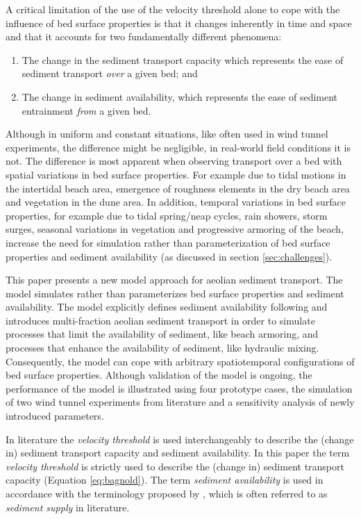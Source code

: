 A critical limitation of the use of the velocity threshold alone to
cope with the influence of bed surface properties is that it changes
inherently in time and space \citep{Stout2004} and that it accounts
for two fundamentally different phenomena:
\begin{enumerate}
\item The change in the sediment transport capacity which represents
  the ease of sediment transport \emph{over} a given bed; and
\item The change in sediment availability, which represents the ease
  of sediment entrainment \emph{from} a given bed.
\end{enumerate}
\noindent Although in uniform and constant situations, like often used
in wind tunnel experiments, the difference might be negligible, in
real-world field conditions it is not. The difference is most apparent
when observing transport over a bed with spatial variations in bed
surface properties. For example due to tidal motions in the intertidal
beach area, emergence of roughness elements in the dry beach area and
vegetation in the dune area. In addition, temporal variations in bed
surface properties, for example due to tidal spring/neap cycles, rain
showers, storm surges, seasonal variations in vegetation and
progressive armoring of the beach, increase the need for simulation
rather than parameterization of bed surface properties and sediment
availability (as discussed in section \ref{sec:challenges}).

This paper presents a new model approach for aeolian sediment
transport. The model simulates rather than parameterizes bed surface
properties and sediment availability. The model explicitly defines
sediment availability following \citet{deVries2014a} and introduces
multi-fraction aeolian sediment transport in order to simulate
processes that limit the availability of sediment, like beach
armoring, and processes that enhance the availability of sediment,
like hydraulic mixing. Consequently, the model can cope with arbitrary
spatiotemporal configurations of bed surface properties. Although
validation of the model is ongoing, the performance of the model is
illustrated using four prototype cases, the simulation of two wind
tunnel experiments from literature \citep{Nickling1995, Dong2004b} and
a sensitivity analysis of newly introduced parameters.

\vspace{.5cm}

In literature the \emph{velocity threshold} is used interchangeably to
describe the (change in) sediment transport capacity and sediment
availability. In this paper the term \emph{velocity threshold} is
strictly used to describe the (change in) sediment transport capacity
(Equation \ref{eq:bagnold}). The term \emph{sediment availability} is
used in accordance with the terminology proposed by
\citet{Kocurek1999}, which is often referred to as \emph{sediment
  supply} in literature.

